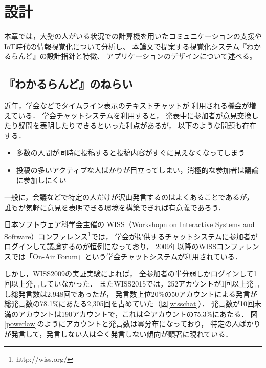 \chapter{設計}
\label{chap:wakaruland}

本章では，大勢の人がいる状況での計算機を用いたコミュニケーションの支援や
IoT時代の情報視覚化について分析し、
本論文で提案する視覚化システム『わかるらんど』の設計指針と特徴、
アプリケーションのデザインについて述べる。

\newpage

\section{『わかるらんど』のねらい}
\label{nerai}

近年，学会などでタイムライン表示のテキストチャットが
利用される機会が増えている\cite{goto2012}．
学会チャットシステムを利用すると，
発表中に参加者が意見交換したり疑問を表明したりできるといった利点があるが，
以下のような問題も存在する．

\begin{itemize}
\item 多数の人間が同時に投稿すると投稿内容がすぐに見えなくなってしまう
\item 投稿の多いアクティブな人ばかりが目立ってしまい，消極的な参加者は議論に参加しにくい
\end{itemize}

一般に，会議などで特定の人だけが沢山発言するのはよくあることであるが，
誰もが気軽に意見を表明できる環境を構築できれば有意義であろう．

日本ソフトウェア科学会主催の
WISS（Workshopn on Interactive Systems and Software）コンファレンス\footnote{\textsf{http://wiss.org/}}では，
学会が提供するチャットシステムに参加者がログインして議論するのが恒例になっており\cite{wiss_challenge}，
2009年以降のWISSコンファレンスでは「On-Air Forum」\cite{nishida2011}という学会チャットシステムが利用されている．

しかし，WISS2009の実証実験によれば，
全参加者の半分弱しかログインして1回以上発言していなかった．
またWISS2015では，252アカウントが1回以上発言し総発言数は2,948回であったが，
発言数上位20\%の50アカウントによる発言が
総発言数の78.1\%にあたる2,305回を占めていた（図\ref{wisschat}）．
発言数が10回未満のアカウントは190アカウントで，これは全アカウントの75.3\%にあたる．
図\ref{powerlaw}のようにアカウントと発言数は冪分布になっており，
特定の人ばかりが発言して，発言しない人は全く発言しない傾向が顕著に現れている．

